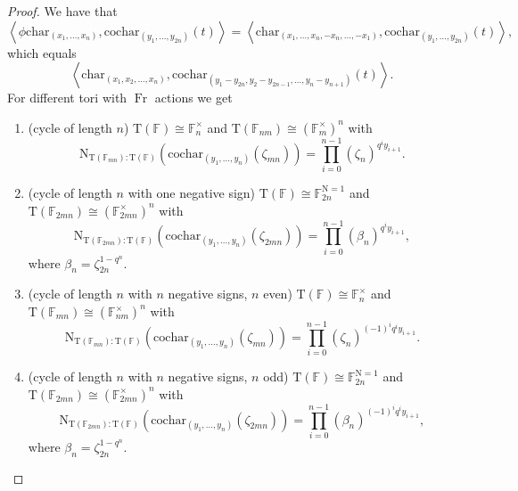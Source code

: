 \documentclass[12pt, reqno]{amsart}
\theoremstyle{definition}
\theoremstyle{definition}
\theoremstyle{definition}
\newcommand{\multiplicativegroup}[1]{#1^{\times}}
\newcommand{\innerproduct}[2]{\left\langle #1,#2\right\rangle}
\newcommand{\FieldNorm}[2]{\mathrm{N}_{#1:#2}}
\newcommand{\aFieldNorm}{\mathrm{N}}
\newcommand{\finiteField}{\mathbb{F}}
\newcommand{\finiteFieldExtension}[1]{\finiteField_{#1}}
\newcommand{\NormOneGroup}[1]{\finiteFieldExtension{#1}^{\aFieldNorm = 1}}
\newcommand{\Frobenius}{\operatorname{Fr}}
\newcommand{\algebraicGroup}[1]{\boldsymbol{\mathrm{#1}}}
\newcommand{\Cocharacter}{\mathrm{cochar}}
\newcommand{\Character}{\mathrm{char}}
\begin{document}
\begin{proof}
We have that $$\innerproduct{\phi \Character_{(x_1,\dots,x_{n})}}{\Cocharacter_{(y_1,\dots, y_{2n})}\left(t\right)} = \innerproduct{\Character_{(x_1,\dots,x_n, -x_n,\dots,-x_1)}}{\Cocharacter_{(y_1,\dots, y_{2n})}\left(t\right)},$$
which equals $$\innerproduct{\Character_{(x_1,x_2,\dots,x_{n})}}{\Cocharacter_{(y_1-y_{2n},y_2-y_{2n-1},\dots, y_n-y_{n+1})}\left(t\right)}.$$
For different tori with $\Frobenius$ actions we get
\begin{enumerate}
    \item (cycle of length $n$) $\algebraicGroup{T}(\finiteField) \cong \finiteField_n^\times$ and $\algebraicGroup{T}\left(\finiteFieldExtension{nm}\right) \cong \left(\multiplicativegroup{\finiteFieldExtension{m}}\right)^n$ with $$\FieldNorm{\algebraicGroup{T}(\finiteField_{mn})}{\algebraicGroup{T}(\finiteField)}\left(\Cocharacter_{(y_1,\dots,y_n)}(\zeta_{mn})\right) = \prod_{i=0}^{n-1} \left(\zeta_n\right)^{q^{i} y_{i+1}}.$$
    \item (cycle of length $n$ with one negative sign) $\algebraicGroup{T}(\finiteField) \cong \NormOneGroup{2n}$ and $\algebraicGroup{T}\left(\finiteFieldExtension{2mn}\right) \cong \left(\multiplicativegroup{\finiteFieldExtension{2mn}}\right)^{n}$ with $$\FieldNorm{\algebraicGroup{T}(\finiteField_{2mn})}{\algebraicGroup{T}(\finiteField)}\left(\Cocharacter_{(y_1,\dots, y_n)}\left(\zeta_{2mn}\right)\right) = \prod_{i=0}^{n-1}(\beta_n)^{q^{i} y_{i+1}},$$
    where $\beta_n = \zeta_{2n}^{1-q^n}$.
    \item (cycle of length $n$ with $n$ negative signs, $n$ even) $\algebraicGroup{T}(\finiteField) \cong \finiteField_n^\times$ and $\algebraicGroup{T}\left(\finiteFieldExtension{mn}\right) \cong \left(\multiplicativegroup{\finiteFieldExtension{nm}}\right)^n$ with $$\FieldNorm{\algebraicGroup{T}(\finiteField_{mn})}{\algebraicGroup{T}(\finiteField)}\left(\Cocharacter_{(y_1,\dots,y_n)}(\zeta_{mn})\right) = \prod_{i=0}^{n-1} (\zeta_n)^{\left(-1\right)^{i} q^{i} y_{i+1}}.$$
    \item (cycle of length $n$ with $n$ negative signs, $n$ odd) $\algebraicGroup{T}(\finiteField) \cong \NormOneGroup{2n}$ and $\algebraicGroup{T}\left(\finiteFieldExtension{2mn}\right) \cong \left(\multiplicativegroup{\finiteFieldExtension{2mn}}\right)^{n}$ with $$\FieldNorm{\algebraicGroup{T}(\finiteField_{2mn})}{\algebraicGroup{T}(\finiteField)}\left(\Cocharacter_{(y_1,\dots, y_n)}\left(\zeta_{2mn}\right)\right) = \prod_{i=0}^{n-1} (\beta_n)^{\left(-1\right)^{i}q^{i}y_{i+1}},$$
    where $\beta_n = \zeta_{2n}^{1-q^n}$.
\end{enumerate}

\end{proof}
\end{document}
